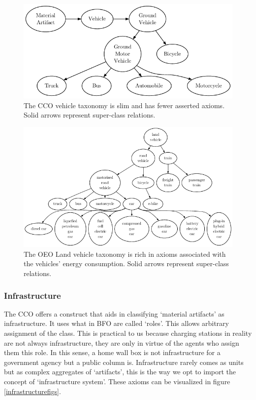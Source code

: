 \begin{figure}[h]
    \centering
    \includegraphics{images/CCOVehicles.pdf}
    \caption{The CCO vehicle taxonomy is slim and has fewer asserted axioms. Solid arrows represent super-class relations.}
    \label{ccovectax}
\end{figure}
\begin{figure}[h]
    
    \centering
    \includegraphics{images/OEOLVehicles.pdf}
    \caption{The OEO Land vehicle taxonomy is rich in axioms associated with the vehicles' energy consumption. Solid arrows represent super-class relations.}
    \label{landvehicletaxoeo}
\end{figure}

\subsubsection{Infrastructure}

The CCO offers a construct that aids in classifying `material artifacts' as
infrastructure. It uses what in BFO are called `roles'. This allows arbitrary
assignment of the class. This is practical to us because charging stations in
reality are not always infrastructure, they are only in virtue of the agents who
assign them this role. In this sense, a home wall box is not infrastructure for
a government agency but a public column is. Infrastructure rarely comes as units
but as complex aggregates of `artifacts', this is the way we opt to import the
concept of `infrastructure system'. These axioms can be visualized in figure
\ref{infrastructurefigs}.

